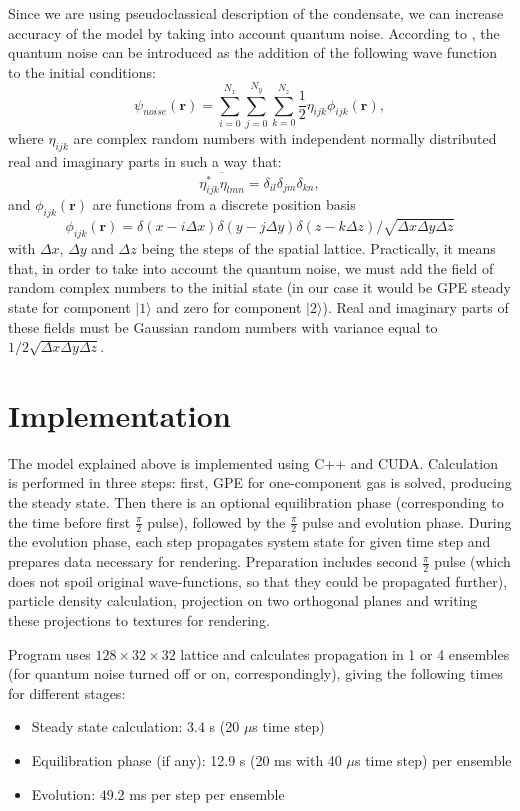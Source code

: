 \documentclass[12pt,notitlepage]{report}
\begin{document}
Since we are using pseudoclassical description of the condensate,
we can increase accuracy of the model by taking into account quantum noise.
According to \cite{PhysRevA.58.4824}, the quantum noise can be introduced
as the addition of the following wave function to the initial conditions:
\[ \psi_{noise}(\mathbf{r}) = \sum_{i=0}^{N_x} \sum_{j=0}^{N_y} \sum_{k=0}^{N_z} \frac{1}{2} \eta_{ijk} \phi_{ijk}(\mathbf{r}), \]
where $\eta_{ijk}$ are complex random numbers with independent normally distributed
real and imaginary parts in such a way that:
\[ \overline{\eta_{ijk}^* \eta_{lmn}} = \delta_{il} \delta_{jm} \delta_{kn}, \]
and $\phi_{ijk}(\mathbf{r})$ are functions from a discrete position basis
\[ \phi_{ijk}(\mathbf{r}) = \delta(x - i\Delta x) \delta(y - j\Delta y) \delta(z - k\Delta z) / \sqrt{\Delta x \Delta y \Delta z} \]
with $\Delta x$, $\Delta y$ and $\Delta z$ being the steps of the spatial lattice.
Practically, it means that, in order to take into account the quantum noise,
we must add the field of random complex numbers to the initial state
(in our case it would be GPE steady state for component $\vert1\rangle$ and zero for component $\vert2\rangle$).
Real and imaginary parts of these fields must be Gaussian random numbers
with variance equal to $1 / 2 \sqrt{\Delta x \Delta y \Delta z}$.

\section*{Implementation}

The model explained above is implemented using C++ and CUDA.
Calculation is performed in three steps: first, GPE for one-component gas is solved, producing the steady state.
Then there is an optional equilibration phase (corresponding to the time before first $\frac{\pi}{2}$ pulse),
followed by the $\frac{\pi}{2}$ pulse and evolution phase.
During the evolution phase, each step propagates system state for given time step and prepares data necessary for rendering.
Preparation includes second $\frac{\pi}{2}$ pulse
(which does not spoil original wave-functions, so that they could be propagated further),
particle density calculation, projection on two orthogonal planes and writing these projections to textures for rendering.

Program uses $128\times32\times32$ lattice and calculates propagation in 1 or 4 ensembles
(for quantum noise turned off or on, correspondingly), giving the following times for different stages:

\begin{itemize}
\item Steady state calculation: 3.4 s (20 $\mu$s time step)
\item Equilibration phase (if any): 12.9 s (20 ms with 40 $\mu$s time step) per ensemble
\item Evolution: 49.2 ms per step per ensemble
\end{itemize}
\end{document}
